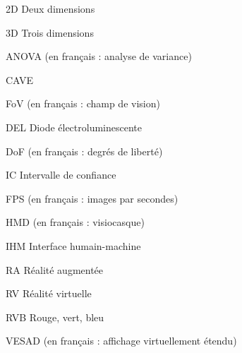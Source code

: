 \begin{listofabbr}[3cm]
  \item[2D] Deux dimensions
  \item[3D] Trois dimensions
  \item[ANOVA]  (en français : analyse de variance)
  \item[CAVE] 
  \item[FoV]  (en français : champ de vision)
  \item[DEL] Diode électroluminescente
  \item[DoF]  (en français : degrés de liberté)
  \item[IC] Intervalle de confiance
  \item[FPS]  (en français : images par secondes)
  \item[HMD]  (en français : visiocasque)
  \item[IHM] Interface humain-machine
  \item[RA] Réalité augmentée
  \item[RV] Réalité virtuelle
  \item[RVB] Rouge, vert, bleu
  \item[VESAD]  (en français : affichage virtuellement étendu)
\end{listofabbr}